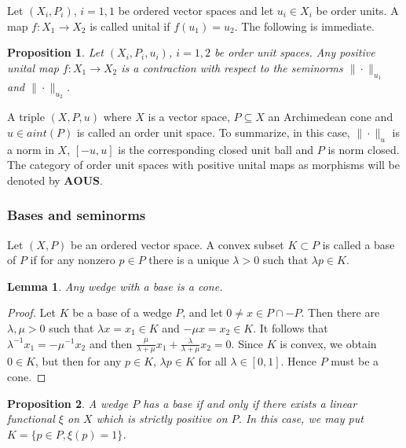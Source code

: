 \documentclass[12pt]{article}
\newtheorem{lemma}{Lemma}
\newtheorem{prop}{Proposition}
\theoremstyle{remark}
\newcommand{\<}{\langle}
\newcommand{\ct}[1]{\mathbf{#1}}
\begin{document}
Let $(X_i,P_i)$, $i=1,1$ be ordered vector spaces and let $u_i\in X_i$ be order units. A map $f:X_1\to X_2$ is called unital if $f(u_1)=u_2$. The following is immediate.

\begin{prop} Let $(X_i,P_i,u_i)$, $i=1,2$ be order unit spaces. Any positive unital map $f:X_1\to X_2$ is a contraction with respect to the seminorms $\|\cdot\|_{u_1}$ and 
$\|\cdot\|_{u_2}$.
\end{prop}

A triple $(X,P,u)$ where $X$ is a vector space, $P\subseteq X$ an Archimedean  cone and $u\in aint(P)$ is called an order unit space. To summarize, in this case, 
$\|\cdot\|_u$ is a norm in $X$, $[-u,u]$ is the corresponding closed unit ball and $P$ is norm closed. The category of order unit spaces with positive unital maps as morphisms will be denoted by $\ct{AOUS}$.


\subsubsection*{Bases and seminorms}

Let $(X,P)$ be an ordered vector space. A convex subset $K\subset P$ is called a base of $P$ if for any nonzero $p\in P$ there is a unique $\lambda>0$  such that 
$\lambda p\in K$.  

\begin{lemma} Any wedge with a base is a cone.

\end{lemma}

\begin{proof} Let $K$ be a base of a wedge $P$, and let $0\neq x\in P\cap -P$. Then there are $\lambda,\mu >0$ such that $\lambda x=x_1\in K$ and $-\mu x=x_2\in K$.  
It follows that $\lambda^{-1}x_1=-\mu^{-1}x_2$ and then  $\tfrac{\mu}{\lambda+\mu}x_1+\tfrac{\lambda}{\lambda+\mu}x_2=0$. Since $K$ is convex, we obtain $0\in K$, but then 
 for any $p\in K$,  $\lambda p\in K$ for all $\lambda\in[0,1]$. Hence $P$ must be a cone. 

\end{proof}

\begin{prop} \label{prop:base} A wedge  $P$ has a base if and only if there exists a linear functional $\xi$ on $X$ which is strictly positive on $P$. In this case, we may put 
 $K=\{p\in P, \xi(p)=1\}$. 
\end{prop}
\end{document}
